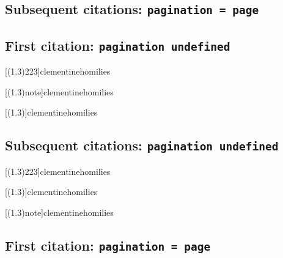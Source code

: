 \documentclass[a4paper]{article}
\begin{document}
\citereset
\cite[note]{augustine:letters:a}

\subsection{Subsequent citations: \texttt{pagination = page}}

\cite{augustine:letters:a}

\cite[10]{augustine:letters:a}

\cite[note]{augustine:letters:a}

\subsection{First citation: \texttt{pagination undefined}}

\cite[(1.3)]{clementinehomilies}

\citereset
\cite[(1.3)8:223]{clementinehomilies}

\citereset
\cite[(1.3)223]{clementinehomilies}

\citereset
{}[(1.3)223]{clementinehomilies}

\citereset
\AtNextCite{\renewcommand*{\volcitedelim}{\addcomma\space}}
[(1.3)note]{clementinehomilies}

\citereset
{}[(1.3)]{clementinehomilies}

\citereset
\cite[(1.3)note]{clementinehomilies}

\subsection{Subsequent citations: \texttt{pagination undefined}}

\cite[(1.3)]{clementinehomilies}

\cite[(1.3)8:223]{clementinehomilies}

\cite[(1.3)223]{clementinehomilies}

[(1.3)223]{clementinehomilies}

[(1.3)]{clementinehomilies}

\AtNextCite{\renewcommand*{\volcitedelim}{\addcomma\space}}
[(1.3)note]{clementinehomilies}

\cite[(1.3)note]{clementinehomilies}

\subsection{First citation: \texttt{pagination = page}}
\end{document}
